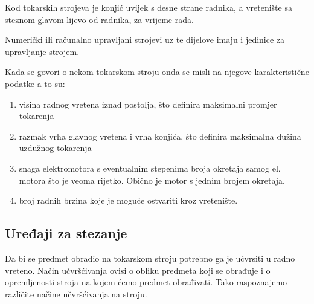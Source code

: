 \documentclass[a4paper,12pt]{article}
\numberwithin{figure}{section}
\begin{document}
Kod tokarskih strojeva je konjić uvijek s desne strane radnika, a vretenište sa steznom glavom lijevo od radnika, za vrijeme rada.\par
Numerički ili računalno upravljani strojevi uz te dijelove imaju i jedinice za upravljanje strojem. \par
Kada se govori o nekom tokarskom stroju onda se misli na njegove karakteristične podatke a to su:
\begin{enumerate}
\item visina radnog vretena iznad postolja, što definira maksimalni promjer tokarenja
\item razmak vrha glavnog vretena i vrha konjića, što definira maksimalna dužina uzdužnog tokarenja
\item snaga elektromotora s eventualnim stepenima broja okretaja samog el. motora što je veoma rijetko. Obično je motor s jednim brojem okretaja.
\item broj radnih brzina koje je moguće ostvariti kroz vretenište.
\end{enumerate}
\subsection{Uređaji za stezanje}
Da bi se predmet obradio na tokarskom stroju potrebno ga je učvrsiti u radno vreteno. Način učvršćivanja ovisi o obliku predmeta koji se obrađuje i o opremljenosti stroja na kojem ćemo predmet obrađivati. Tako raspoznajemo različite načine učvršćivanja na stroju.
\clearpage
\end{document}
